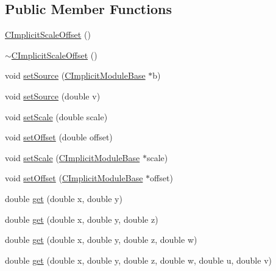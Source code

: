 \subsection*{Public Member Functions}
\begin{DoxyCompactItemize}
\item 
\hyperlink{classanl_1_1CImplicitScaleOffset_a4df77c627577e554c3eead5cb541579a}{CImplicitScaleOffset} ()
\item 
\hyperlink{classanl_1_1CImplicitScaleOffset_a663b26e4701ff4e8818df6e776b7d8bc}{$\sim$CImplicitScaleOffset} ()
\item 
void \hyperlink{classanl_1_1CImplicitScaleOffset_af5992d5de77c4fbcbf74c7705a080438}{setSource} (\hyperlink{classanl_1_1CImplicitModuleBase}{CImplicitModuleBase} $\ast$b)
\item 
void \hyperlink{classanl_1_1CImplicitScaleOffset_af8b6e71f3eca86e9030a36b110214214}{setSource} (double v)
\item 
void \hyperlink{classanl_1_1CImplicitScaleOffset_a790073a10ef4faabb36b7c875a29a59f}{setScale} (double scale)
\item 
void \hyperlink{classanl_1_1CImplicitScaleOffset_ae9d26d26b04003bef03f4eb889d00169}{setOffset} (double offset)
\item 
void \hyperlink{classanl_1_1CImplicitScaleOffset_a2edcad5fbfaa89e5fe28ef5b33ef823b}{setScale} (\hyperlink{classanl_1_1CImplicitModuleBase}{CImplicitModuleBase} $\ast$scale)
\item 
void \hyperlink{classanl_1_1CImplicitScaleOffset_a264fb477f5b1e33c6fc395d2a33a3fcf}{setOffset} (\hyperlink{classanl_1_1CImplicitModuleBase}{CImplicitModuleBase} $\ast$offset)
\item 
double \hyperlink{classanl_1_1CImplicitScaleOffset_ac23178ec8ef455748dfc75684515c291}{get} (double x, double y)
\item 
double \hyperlink{classanl_1_1CImplicitScaleOffset_a1dbdceab30f5303f7fda0eb9a5ca1cdd}{get} (double x, double y, double z)
\item 
double \hyperlink{classanl_1_1CImplicitScaleOffset_a8ac84534b65230172a9f2e61fbfaa0ae}{get} (double x, double y, double z, double w)
\item 
double \hyperlink{classanl_1_1CImplicitScaleOffset_a5e048c2abd25d3b6ba95838fa1c7712d}{get} (double x, double y, double z, double w, double u, double v)
\end{DoxyCompactItemize}

